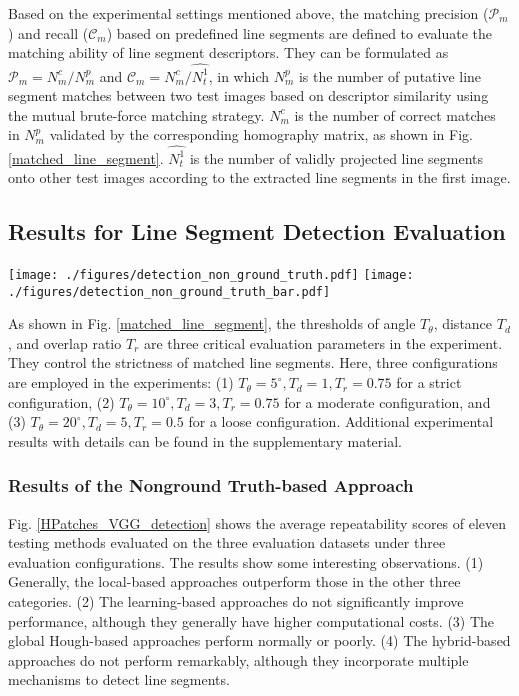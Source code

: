 \documentclass[journal,compsoc]{IEEEtran}
\begin{document}
Based on the experimental settings mentioned above, the matching precision ($\mathcal{P}_{m}$) and recall ($\mathcal{C}_{m}$) based on predefined line segments are defined to evaluate the matching ability of line segment descriptors. They can be formulated as $\mathcal{P}_{m} = {N^c_m}/{N^p_m}$ and $\mathcal{C}_{m} = {N^c_m}/{\hat{N^1_{t}}}$, in which $N^p_m$ is the number of putative line segment matches between two test images based on descriptor similarity using the mutual brute-force matching strategy. $N^c_m$ is the number of correct matches in $N^p_m$ validated by the corresponding homography matrix, as shown in Fig. \ref{matched_line_segment}. $\hat{N^1_{t}}$ is the number of validly projected line segments onto other test images according to the extracted line segments in the first image.


\subsection{Results for Line Segment Detection Evaluation}
\begin{figure*}[tbp]
	\centering
	\texttt{[image: ./figures/detection\_non\_ground\_truth.pdf]}
	\texttt{[image: ./figures/detection\_non\_ground\_truth\_bar.pdf]}
	\caption{The plots show the average repeatability scores of eleven testing methods for line segment detection evaluated on the HPatches \cite{HPatches}, VGGAffine \cite{vggaffine}, and KADID \cite{KADID} datasets under three evaluation configurations.}
	\label{HPatches_VGG_detection}
\end{figure*}

As shown in Fig. \ref{matched_line_segment}, the thresholds of angle $T_\theta$, distance $T_d$, and overlap ratio $T_r$ are three critical evaluation parameters in the experiment. They control the strictness of matched line segments. Here, three configurations are employed in the experiments: (1) $T_\theta = 5^\circ, T_d = 1, T_r = 0.75$ for a strict configuration, (2) $T_\theta = 10^\circ, T_d = 3, T_r = 0.75$ for a moderate configuration, and (3) $T_\theta = 20^\circ, T_d = 5, T_r = 0.5$ for a loose configuration. Additional experimental results with details can be found in the supplementary material.

\subsubsection{Results of the Nonground Truth-based Approach}
Fig. \ref{HPatches_VGG_detection} shows the average repeatability scores of eleven testing methods evaluated on the three evaluation datasets under three evaluation configurations. The results show some interesting observations. (1) Generally, the local-based approaches outperform those in the other three categories. (2) The learning-based approaches do not significantly improve performance, although they generally have higher computational costs. (3) The global Hough-based approaches perform normally or poorly. (4) The hybrid-based approaches do not perform remarkably, although they incorporate multiple mechanisms to detect line segments.
\end{document}
